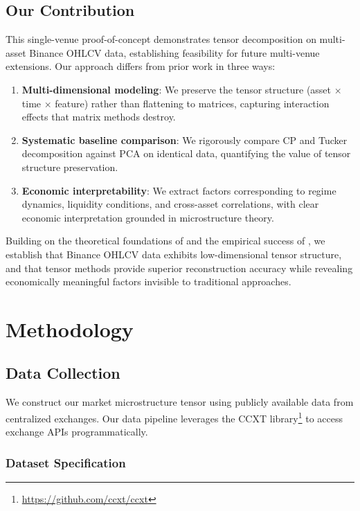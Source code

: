 \documentclass[11pt,twocolumn]{article}
\begin{document}
\subsection{Our Contribution}

This single-venue proof-of-concept demonstrates tensor decomposition on multi-asset Binance OHLCV data, establishing feasibility for future multi-venue extensions. Our approach differs from prior work in three ways:

\begin{enumerate}[leftmargin=*]
    \item \textbf{Multi-dimensional modeling}: We preserve the tensor structure (asset $\times$ time $\times$ feature) rather than flattening to matrices, capturing interaction effects that matrix methods destroy.
    \item \textbf{Systematic baseline comparison}: We rigorously compare CP and Tucker decomposition against PCA on identical data, quantifying the value of tensor structure preservation.
    \item \textbf{Economic interpretability}: We extract factors corresponding to regime dynamics, liquidity conditions, and cross-asset correlations, with clear economic interpretation grounded in microstructure theory.
\end{enumerate}

Building on the theoretical foundations of \citet{Babii2023Tensor} and the empirical success of \citet{Lettau2024ThreeD}, we establish that Binance OHLCV data exhibits low-dimensional tensor structure, and that tensor methods provide superior reconstruction accuracy while revealing economically meaningful factors invisible to traditional approaches.

\section{Methodology}
\label{sec:methodology}

\subsection{Data Collection}

We construct our market microstructure tensor using publicly available data from centralized exchanges. Our data pipeline leverages the CCXT library\footnote{\url{https://github.com/ccxt/ccxt}} to access exchange APIs programmatically.

\subsubsection{Dataset Specification}
\end{document}
